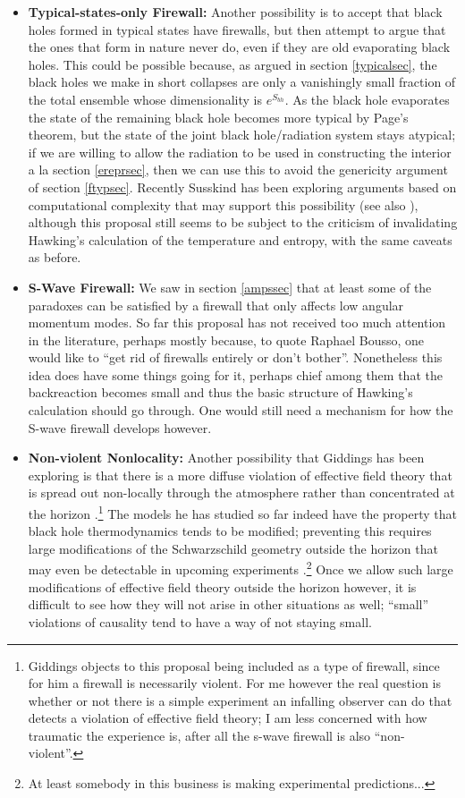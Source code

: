 \documentclass[12pt]{article}
\begin{document}
\begin{itemize}
\item \textbf{Typical-states-only Firewall:} Another possibility is to accept that black holes formed in typical states have firewalls, but then attempt to argue that the ones that form in nature never do, even if they are old evaporating black holes.  This could be possible because, as argued in section \ref{typicalsec}, the black holes we make in short collapses are only a vanishingly small fraction of the total ensemble whose dimensionality is $e^{S_{\mathit{bh}}}$.  As the black hole evaporates the state of the remaining black hole becomes more typical by Page's theorem, but the state of the joint black hole/radiation system stays atypical; if we are willing to allow the radiation to be used in constructing the interior a la section \ref{ereprsec}, then we can use this to avoid the genericity argument of section \ref{ftypsec}.  Recently Susskind has been exploring arguments based on computational complexity that may support this possibility \cite{Susskind:2014rva} (see also \cite{Stanford:2014jda,Susskind:2014jwa}), although this proposal still seems to be subject to the criticism of invalidating Hawking's calculation of the temperature and entropy, with the same caveats as before.  
\item \textbf{S-Wave Firewall:} We saw in section \ref{ampssec} that at least some of the paradoxes can be satisfied by a firewall that only affects low angular momentum modes.  So far this proposal has not received too much attention in the literature, perhaps mostly because, to quote Raphael Bousso, one would like to ``get rid of firewalls entirely or don't bother''.  Nonetheless this idea does have some things going for it, perhaps chief among them that the backreaction becomes small and thus the basic structure of Hawking's calculation should go through.  One would still need a mechanism for how the S-wave firewall develops however.
\item \textbf{Non-violent Nonlocality:}  Another possibility that Giddings has been exploring is that there is a more diffuse violation of effective field theory that is spread out non-locally through the atmosphere rather than concentrated at the horizon \cite{Giddings:2012gc,Giddings:2013noa}.\footnote{Giddings objects to this proposal being included as a type of firewall, since for him a firewall is necessarily violent.  For me however the real question is whether or not there is a simple experiment an infalling observer can do that detects a violation of effective field theory; I am less concerned with how traumatic the experience is, after all the s-wave firewall is also ``non-violent''.}  The models he has studied so far indeed have the property that black hole thermodynamics tends to be modified; preventing this requires large modifications of the Schwarzschild geometry outside the horizon that may even be detectable in upcoming experiments \cite{Almheiri:2013hfa,Giddings:2013vda,Giddings:2014ova}.\footnote{At least somebody in this business is making experimental predictions...}  Once we allow such large modifications of effective field theory outside the horizon however, it is difficult to see how they will not arise in other situations as well; ``small'' violations of causality tend to have a way of not staying small.  

\end{itemize}
\end{document}

